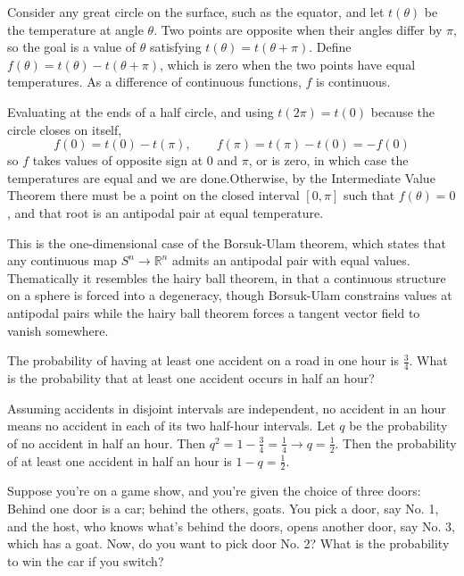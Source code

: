 \begin{solution}
Consider any great circle on the surface, such as the equator, and let $t(\theta)$ be the temperature at angle $\theta$. Two points are opposite when their angles differ by $\pi$, so the goal is a value of $\theta$ satisfying $t(\theta) = t(\theta + \pi)$. Define $f(\theta) = t(\theta) - t(\theta + \pi)$, which is zero when the two points have equal temperatures. As a difference of continuous functions, $f$ is continuous.

Evaluating at the ends of a half circle, and using $t(2\pi) = t(0)$ because the circle closes on itself,
\[
f(0) = t(0) - t(\pi), \qquad f(\pi) = t(\pi) - t(0) = -f(0)
\]
so $f$ takes values of opposite sign at $0$ and $\pi$, or is zero, in which case the temperatures are equal and we are done.Otherwise, by the Intermediate Value Theorem there must be a point on the closed interval $[0, \pi]$ such that $f(\theta) = 0$, and that root is an antipodal pair at equal temperature.

This is the one-dimensional case of the Borsuk-Ulam theorem, which states that any continuous map $S^n \rightarrow \mathbb{R}^n$ admits an antipodal pair with equal values. Thematically it resembles the hairy ball theorem, in that a continuous structure on a sphere is forced into a degeneracy, though Borsuk-Ulam constrains values at antipodal pairs while the hairy ball theorem forces a tangent vector field to vanish somewhere.
\end{solution}

\begin{problem}
The probability of having at least one accident on a road in one hour is $\frac{3}{4}$. What is the probability that at least one accident occurs in half an hour?
\end{problem}

\begin{solution}
Assuming accidents in disjoint intervals are independent, no accident in an hour means no accident in each of its two half-hour intervals. Let $q$ be the probability of no accident in half an hour. Then $q^2 = 1 - \frac{3}{4} = \frac{1}{4} \rightarrow q = \frac{1}{2}$. Then the probability of at least one accident in half an hour is $1-q = \frac{1}{2}$.
\end{solution}

\begin{problem}
Suppose you're on a game show, and you're given the choice of three doors: Behind one door is a car; behind the others, goats. You pick a door, say No. 1, and the host, who knows what's behind the doors, opens another door, say No. 3, which has a goat. Now, do you want to pick door No. 2? What is the probability to win the car if you switch?
\end{problem}

